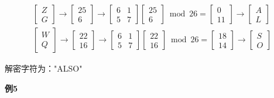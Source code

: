 \documentclass{article}
\begin{document}
$$
\begin{array}{l}
{\left[\begin{array}{l}
Z \\
G
\end{array}\right] \rightarrow\left[\begin{array}{c}
25 \\
6
\end{array}\right] \rightarrow\left[\begin{array}{ll}
6 & 1 \\
5 & 7
\end{array}\right]\left[\begin{array}{c}
25 \\
6
\end{array}\right] \bmod 26=\left[\begin{array}{l}
0 \\
11
\end{array}\right] \rightarrow\left[\begin{array}{l}
A \\
L
\end{array}\right]} \\
\left[\begin{array}{l}
W \\
Q
\end{array}\right] \rightarrow\left[\begin{array}{l}
22 \\
16
\end{array}\right] \rightarrow\left[\begin{array}{ll}
6&1 \\
5&7
\end{array}\right]\left[\begin{array}{l}
22 \\
16
\end{array}\right] \bmod 26 =\left[\begin{array}{l}
18 \\
14
\end{array}\right] \rightarrow\left[\begin{array}{l}
S \\
O
\end{array}\right]
\end{array}
$$

解密字符为："ALSO"

\clearpage

\textbf{例5}
\end{document}
